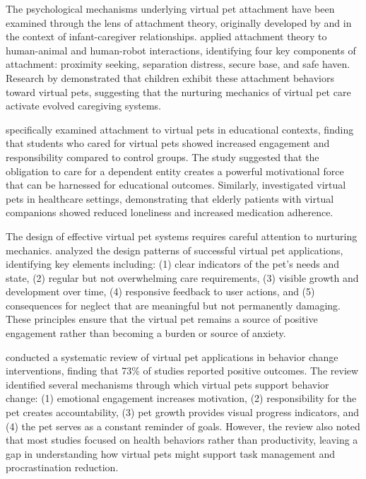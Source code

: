 The psychological mechanisms underlying virtual pet attachment have been examined through the lens of attachment theory, originally developed by \citet{bowlby1969attachment} and \citet{ainsworth1978patterns} in the context of infant-caregiver relationships. \citet{konok2016children} applied attachment theory to human-animal and human-robot interactions, identifying four key components of attachment: proximity seeking, separation distress, secure base, and safe haven. Research by \citet{melson2001companion} demonstrated that children exhibit these attachment behaviors toward virtual pets, suggesting that the nurturing mechanics of virtual pet care activate evolved caregiving systems.

\citet{thomas2013attachment} specifically examined attachment to virtual pets in educational contexts, finding that students who cared for virtual pets showed increased engagement and responsibility compared to control groups. The study suggested that the obligation to care for a dependent entity creates a powerful motivational force that can be harnessed for educational outcomes. Similarly, \citet{blocker2017pets} investigated virtual pets in healthcare settings, demonstrating that elderly patients with virtual companions showed reduced loneliness and increased medication adherence.

The design of effective virtual pet systems requires careful attention to nurturing mechanics. \citet{bara2007nurturing} analyzed the design patterns of successful virtual pet applications, identifying key elements including: (1) clear indicators of the pet's needs and state, (2) regular but not overwhelming care requirements, (3) visible growth and development over time, (4) responsive feedback to user actions, and (5) consequences for neglect that are meaningful but not permanently damaging. These principles ensure that the virtual pet remains a source of positive engagement rather than becoming a burden or source of anxiety.

\citet{van2015virtual} conducted a systematic review of virtual pet applications in behavior change interventions, finding that 73\% of studies reported positive outcomes. The review identified several mechanisms through which virtual pets support behavior change: (1) emotional engagement increases motivation, (2) responsibility for the pet creates accountability, (3) pet growth provides visual progress indicators, and (4) the pet serves as a constant reminder of goals. However, the review also noted that most studies focused on health behaviors rather than productivity, leaving a gap in understanding how virtual pets might support task management and procrastination reduction.

